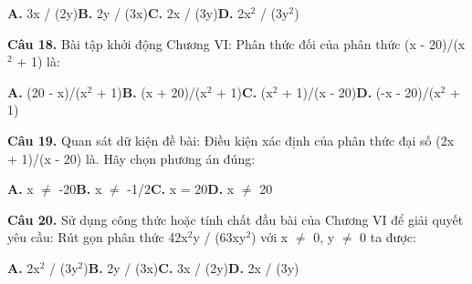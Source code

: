 \documentclass[11pt,a4paper]{article}
\begin{document}
\hspace*{1.5em}\textbf{A.} 3x / (2y)\quad\quad \textbf{B.} 2y / (3x)\quad\quad \textbf{C.} 2x / (3y)\quad\quad \textbf{D.} 2x$^2$ / (3y$^2$)\par\vspace{2pt}
\textbf{\color{primary} Câu 18.} Bài tập khởi động Chương VI: Phân thức đối của phân thức (x - 20)/(x$^2$ + 1) là:\par
\hspace*{1.5em}\textbf{A.} (20 - x)/(x$^2$ + 1)\quad\quad \textbf{B.} (x + 20)/(x$^2$ + 1)\quad\quad \textbf{C.} (x$^2$ + 1)/(x - 20)\quad\quad \textbf{D.} (-x - 20)/(x$^2$ + 1)\par\vspace{2pt}
\textbf{\color{primary} Câu 19.} Quan sát dữ kiện đề bài: Điều kiện xác định của phân thức đại số (2x + 1)/(x - 20) là. Hãy chọn phương án đúng:\par
\hspace*{1.5em}\textbf{A.} x $\ne$ -20\quad\quad \textbf{B.} x $\ne$ -1/2\quad\quad \textbf{C.} x = 20\quad\quad \textbf{D.} x $\ne$ 20\par\vspace{2pt}
\textbf{\color{primary} Câu 20.} Sử dụng công thức hoặc tính chất đầu bài của Chương VI để giải quyết yêu cầu: Rút gọn phân thức 42x$^2$y / (63xy$^2$) với x $\ne$ 0, y $\ne$ 0 ta được:\par
\hspace*{1.5em}\textbf{A.} 2x$^2$ / (3y$^2$)\quad\quad \textbf{B.} 2y / (3x)\quad\quad \textbf{C.} 3x / (2y)\quad\quad \textbf{D.} 2x / (3y)\par\vspace{2pt}
\end{document}
